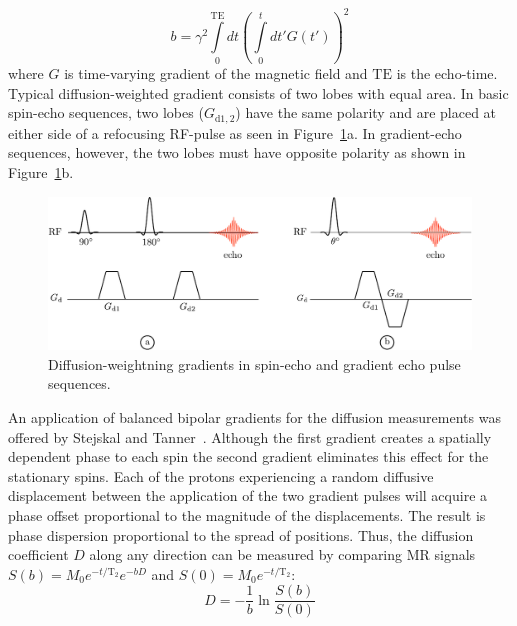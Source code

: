 \begin{equation}\label{eq: b-value}
b=\gamma^2\int\limits_{0}^{\mathrm{TE}}dt\left(\int\limits_{0}^{t}dt'G(t')\right)^2
\end{equation}
where $G$ is time-varying gradient of the magnetic field and $\mathrm{TE}$ is the echo-time.
Typical diffusion-weighted gradient consists of two lobes with equal area. In basic spin-echo sequences, two lobes ($G_{\mathrm{d1,2}}$) have the same polarity and are placed at either side of a refocusing RF-pulse as seen in Figure~\ref{fig: DTISeq}a. 
In gradient-echo sequences, however, the two lobes must have opposite polarity as shown in Figure~\ref{fig: DTISeq}b.
\begin{figure}[t]
\vspace{+0.2cm}
\centering
\includegraphics[width=1\textwidth]{Figures/DiffusionPS.pdf}
\caption[Diffusion-weightning gradients in spin-echo and gradient echo pulse sequences]{Diffusion-weightning gradients in spin-echo and gradient echo pulse sequences.}\label{fig: DTISeq}
\end{figure}
An application of balanced bipolar gradients for the diffusion measurements was offered by Stejskal and Tanner~\cite{Stejskal}. 
Although the first gradient creates a spatially dependent phase to each spin the second gradient eliminates this effect for the stationary spins. 
Each of the protons experiencing a random diffusive displacement between the application of the two gradient pulses will acquire a phase offset proportional to the magnitude of the displacements. 
The result is phase dispersion proportional to the spread of positions. Thus, the diffusion coefficient $D$ along any direction can be measured by comparing MR signals $S(b)=M_0e^{-t/\mathrm{T_2}}e^{-bD}$ and $S(0)=M_0e^{-t/\mathrm{T_2}}$:
\begin{equation}\label{eq: Diffusion from bvalue}
D=-\frac{1}{b}\ln{\frac{S(b)}{S(0)}}
\end{equation}
